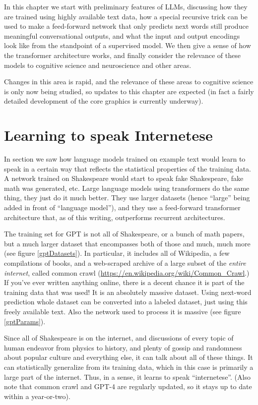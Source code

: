 In this chapter we start with preliminary features of LLMs, discussing how they are trained using highly available text data, how a special recursive trick can be used to make a feed-forward network that only predicts next words still produce meaningful conversational outputs, and what the input and output encodings look like from the standpoint of a supervised model. We then give a sense of how the transformer architecture works, and finally consider the relevance of these models to cognitive science and neuroscience and other areas.

Changes in this area is rapid, and the relevance of these areas to cognitive science is only now being studied, so updates to this chapter are expected (in fact a fairly detailed development of the core graphics is currently underway).


\section{Learning to speak Internetese}

In section  we saw how language models trained on example text would learn to speak in a certain way that reflects the statistical properties of the training data. A network trained on Shakespeare would start to speak fake Shakespeare, fake math was generated, etc. 
Large language models using transformers do the same thing, they just do it much better. They use larger datasets (hence ``large'' being added in front of ``language model''), and they use a feed-forward transformer architecture that, as of this writing, outperforms recurrent architectures. 

The training set for GPT is not all of Shakespeare, or a bunch of math papers, but a much larger dataset that encompasses both of those and much, much more (see figure \ref{gptDatasets}).  In particular, it includes all of Wikipedia, a few compilations of books, and a web-scraped archive of a large subset of the \emph{entire internet}, called common crawl (\url{https://en.wikipedia.org/wiki/Common_Crawl}.) If you've ever written anything online, there is a decent chance it is part of the training data that was used! It is an absolutely massive dataset. Using next-word prediction whole dataset can be converted into a labeled dataset, just using this freely available text.  Also the network used to process it is massive (see figure \ref{gptParams}). 

Since all of Shakespeare is on the internet, and discussions of every topic of human endeavor from physics to history, and plenty of gossip and randomness about popular culture and everything else, it can talk about all of these things.  It can statistically generalize from its training data, which in this case is primarily a large part of the internet. Thus, in a sense, it learns to speak ``internetese''.  (Also note that common crawl and GPT-4 are regularly updated, so it stays up to date within a year-or-two). 

